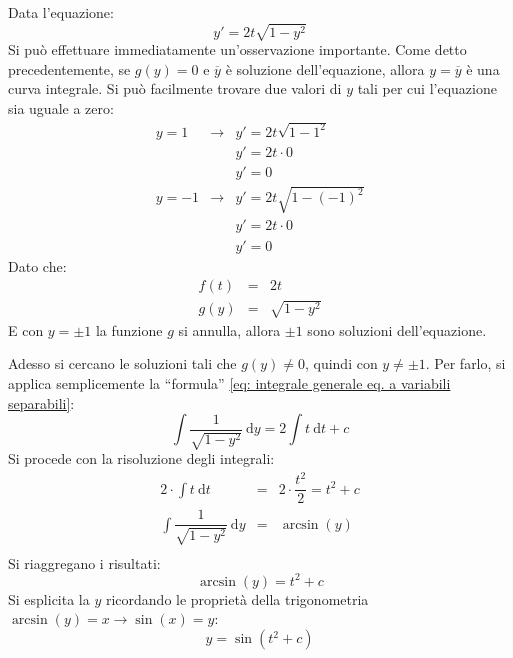 \documentclass[a4paper]{article}
\newcommand{\dquotes}[1]{``#1''}
\begin{document}
	\noindent
	Data l'equazione:
	\begin{equation*}
		y' = 2t \sqrt{1-y^{2}}
	\end{equation*}
	Si può effettuare immediatamente un'osservazione importante. Come detto precedentemente, se $g\left(y\right) = 0$ e $\overline{y}$ è soluzione dell'equazione, allora $y = \overline{y}$ è una curva integrale. Si può facilmente trovare due valori di $y$ tali per cui l'equazione sia uguale a zero:
	\begin{equation*}
		\begin{array}{rcl}
			y = 1 & \longrightarrow & y' = 2t \sqrt{1 - 1^{2}} \\
				  &					& y' = 2 t \cdot 0 \\
				  &					& y' = 0 \\ [1em]
			y = -1& \longrightarrow & y' = 2t \sqrt{1 - \left(-1\right)^{2}} \\
				  & 				& y' = 2t \cdot 0 \\
				  &					& y' = 0
		\end{array}
	\end{equation*}
	Dato che:
	\begin{equation*}
		\begin{array}{rcl}
			f\left(t\right) &=& 2t \\
			g\left(y\right) &=& \sqrt{1-y^{2}}
		\end{array}
	\end{equation*}
	E con $y = \pm 1$ la funzione $g$ si annulla, allora $\pm 1$ sono soluzioni dell'equazione.\newline

	\noindent
	Adesso si cercano le soluzioni tali che $g\left(y\right) \ne 0$, quindi con $y \ne \pm 1$. Per farlo, si applica semplicemente la \dquotes{formula} \ref{eq: integrale generale eq. a variabili separabili}:
	\begin{equation*}
		\displaystyle\int \dfrac{1}{\sqrt{1-y^{2}}} \: \mathrm{d}y = 2 \displaystyle\int t \: \mathrm{d}t + c
	\end{equation*}
	Si procede con la risoluzione degli integrali:
	\begin{equation*}
		\begin{array}{rcl}
			\displaystyle 2 \cdot \int t \: \mathrm{d}t &=& 2 \cdot \dfrac{t^{2}}{2} = t^{2} + c \\ [2em]
			\displaystyle \int \dfrac{1}{\sqrt{1 - y^{2}}} \: \mathrm{d}y & = & \arcsin\left(y\right) \\
		\end{array}
	\end{equation*}
	Si riaggregano i risultati:
	\begin{equation*}
		\arcsin\left(y\right) = t^{2} + c
	\end{equation*}
	Si esplicita la $y$ ricordando le proprietà della trigonometria $\arcsin\left(y\right) = x \rightarrow \sin\left(x\right) = y$:
	\begin{equation*}
		y = \sin\left(t^{2} + c\right)
	\end{equation*}
	
\end{document}
